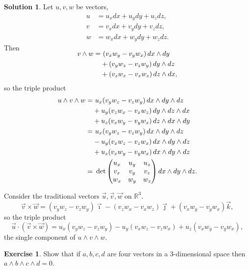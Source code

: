 \documentclass[11pt, a4paper]{report}
\theoremstyle{definition}
\newtheorem{exercise}{Exercise}[part]
\newtheorem{solution}{Solution}[part]
\newenvironment{ex}{\begin{exercise}}{\end{exercise}\pagebreak[1]}
\newenvironment{sol}{\begin{solution}}{\end{solution}\pagebreak[3]}
\renewcommand*{\d}{\ensuremath\mathop{}\mathopen{}d}
\begin{document}
\begin{sol}

Let $u, v, w$ be vectors,
\begin{align*}
    u &= u_x dx + u_y dy + u_z dz, \\
    v &= v_x dx + v_y dy + v_z dz, \\
    w &= w_x dx + w_y dy + w_z dz.
\end{align*}
Then
\begin{align*}
    \SwapAboveDisplaySkip
    v \wedge w =&\ (v_x w_y - v_y w_x) \d x \wedge dy \\
                &+ (v_y w_z - v_z w_y) \d y \wedge dz \\
                &+ (v_z w_x - v_x w_z) \d z \wedge dx,
\end{align*}
so the triple product
\begin{align*}
    u \wedge v \wedge w =&\ u_x (v_y w_z - v_z w_y) \d x \wedge dy \wedge dz \\
        &+ u_y (v_z w_x - v_x w_z) \d y \wedge dz \wedge dx \\
        &+ u_z (v_x w_y - v_y w_x) \d z \wedge dx \wedge dy \\
        =&\ u_x (v_y w_z - v_z w_y) \d x \wedge dy \wedge dz \\
        &- u_y (v_x w_z - v_z w_x) \d x \wedge dy \wedge dz \\
        &+ u_z (v_x w_y - v_y w_x) \d x \wedge dy \wedge dz \\
        =&\ \det \begin{pmatrix}
                u_x & u_y & u_z \\
                v_x & v_y & v_z \\
                w_x & w_y & w_z
            \end{pmatrix} dx \wedge dy \wedge dz.
\end{align*}

Consider the traditional vectors $\vec{u}, \vec{v}, \vec{w}$ on $\mathbb{R}^3$.
\[
    \vec{v} \times \vec{w}
        = (v_y w_z - v_z w_y) \vec{\imath}
          - (v_z w_x - v_x w_z) \vec{\jmath}
          + (v_x w_y - v_y w_x) \vec{k},
\]
so the triple product
\[
    \vec{u} \cdot (\vec{v} \times \vec{w})
        = u_x (v_y w_z - v_z w_y)
          - u_y (v_x w_z - v_z w_x)
          + u_z (v_x w_y - v_y w_x),
\]
the single component of $u \wedge v \wedge w$.

\end{sol}

\begin{ex}

Show that if $a, b, c, d$ are four vectors in a 3-dimensional space then $a \wedge b \wedge c \wedge d = 0$.

\end{ex}
\end{document}
